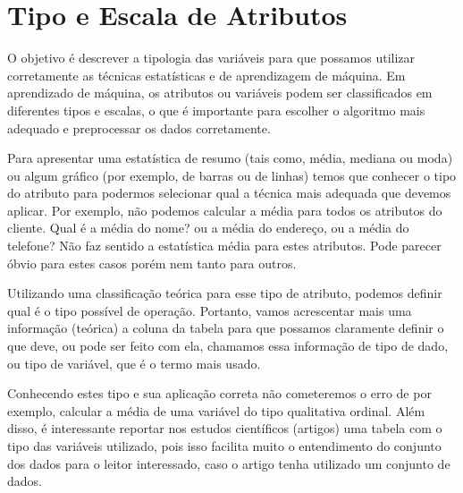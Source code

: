 \documentclass[a4paper,12pt]{book}
\begin{document}


\chapter{Tipo e Escala de Atributos}

\begin{tcolorbox}
O objetivo é descrever a tipologia das variáveis para que possamos utilizar corretamente as técnicas estatísticas e de aprendizagem de máquina. Em aprendizado de máquina, os atributos ou variáveis podem ser classificados em diferentes tipos e escalas, o que é importante para escolher o algoritmo mais adequado e preprocessar os dados corretamente.
\end{tcolorbox}

Para apresentar uma estatística de resumo (tais como, média, mediana ou moda) ou algum gráfico (por exemplo, de barras ou de linhas) temos que conhecer o tipo do atributo para podermos selecionar qual a técnica mais adequada que devemos aplicar. Por exemplo, não podemos calcular a média para todos os atributos do cliente. Qual é a média do nome? ou a média do endereço, ou a média do telefone? Não faz sentido a estatística média para estes atributos. Pode parecer óbvio para estes casos porém nem tanto para outros.

Utilizando uma classificação teórica para esse tipo de atributo, podemos definir qual é o tipo possível de operação. Portanto, vamos acrescentar mais uma informação (teórica) a coluna da tabela para que possamos claramente definir o que deve, ou pode ser feito com ela, chamamos essa informação de tipo de dado, ou tipo de variável, que é o termo mais usado.

Conhecendo estes tipo e sua aplicação correta não cometeremos o erro de por exemplo, calcular a média de uma variável do tipo qualitativa ordinal. Além disso, é interessante reportar nos estudos científicos (artigos) uma tabela com o tipo das variáveis utilizado, pois isso facilita muito o entendimento do conjunto dos dados para o leitor interessado, caso o artigo tenha utilizado um conjunto de dados.
\end{document}
